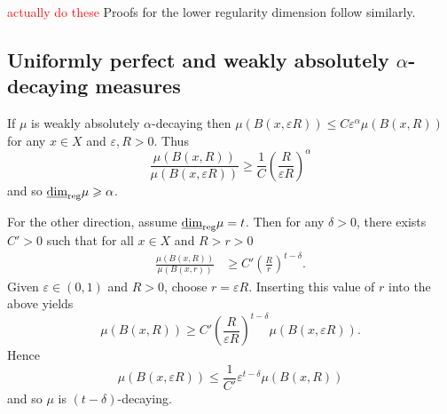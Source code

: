 \textcolor{red}{actually do these}	
Proofs for the lower regularity dimension follow similarly.













\subsection{Uniformly perfect and weakly absolutely $\alpha$-decaying measures}



	If $\mu$ is weakly absolutely $\alpha$-decaying then $\mu(B(x,\varepsilon R)) \le C \varepsilon^{\alpha} \mu(B(x,R))$ for any $x\in X$ and $\varepsilon, R >0$. Thus
	\[
	\frac{\mu(B(x,R))}{\mu(B(x,\varepsilon R))} \ge \frac{1}{C} \left(\frac{R}{\varepsilon R} \right)^{\alpha}
	\]
	and so $\underline{\dim}_{\textup{reg}} \mu \geqslant \alpha$.
	
	For the other direction, assume $\underline{\dim}_{\textup{reg}} \mu = t$. Then for any $\delta > 0$, there exists $C' > 0$ such that for all $x\in X$ and $R>r>0$ 
	\begin{align*}
	\frac{\mu(B(x,R))}{\mu(B(x,r))} &\ge C' \left( \frac{R}{r}\right)^{t - \delta}.
	\end{align*}
	Given $\varepsilon \in (0,1)$ and $R > 0$, choose $r = \varepsilon R$. Inserting this value of $r$ into the above yields 
	\[\mu(B(x,R)) \ge C' \left(\frac{R}{\varepsilon R}\right)^{t-\delta} \mu(B(x,\varepsilon R)).
	\]
	Hence
	\[
	\mu(B(x,\varepsilon R)) \le \frac{1}{C'} \varepsilon^{t - \delta} \mu(B(x,R))  
	\]
	and so $\mu$ is $(t-\delta)$-decaying.




